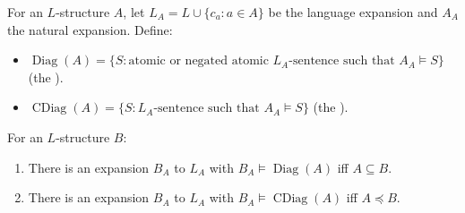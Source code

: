 For an $L$-structure $A$, let $L_A = L \cup \{c_a : a \in A\}$ be the language expansion and $A_A$ the natural expansion. Define:
\begin{itemize}
\item $\operatorname{Diag}(A) = \{S : \text{atomic or negated atomic } L_A\text{-sentence such that } A_A \vDash S\}$ (the ).
\item $\operatorname{CDiag}(A) = \{S : L_A\text{-sentence such that } A_A \vDash S\}$ (the ).
\end{itemize}
For an $L$-structure $B$:
\begin{enumerate}
\item There is an expansion $B_A$ to $L_A$ with $B_A \vDash \operatorname{Diag}(A)$ iff $A \subseteq B$.
\item There is an expansion $B_A$ to $L_A$ with $B_A \vDash \operatorname{CDiag}(A)$ iff $A \preceq B$.
\end{enumerate}
